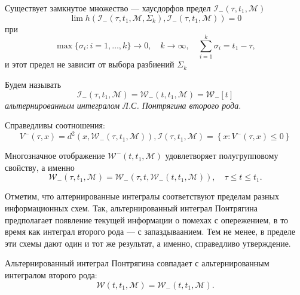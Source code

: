 \begin{lemma}
    Существует замкнутое множество --- хаусдорфов предел \( \mathcal{I}_-(\tau, t_1, \mathcal{M}) \)
    \[
        \lim h \left( \mathcal{I}_-(\tau, t_1, \mathcal{M}, \Sigma_k), \mathcal{I}_-(\tau, t_1,
         \mathcal{M}) \right) = 0    
    \]
    при
    \[
        \max\{\sigma_i : i = 1, \dots, k \} \to 0, \quad k \to \infty, \quad \sum_{i = 1}^k 
         \sigma_i = t_1 - \tau,
    \]
    и этот предел не зависит от выбора разбиений \( \Sigma_k \)
\end{lemma}

Будем называть
\[ 
    \mathcal{I}_-(\tau, t_1, \mathcal{M}) = \mathcal{W}_-(t, t_1, \mathcal{M}) = \mathcal{W}_-[t]
\]
\emph{альтернированным интегралом Л.С. Понтрягина второго рода}.

\begin{lemma}
    Справедливы соотношения:
    \[
        V^-(\tau, x) = d^2(x, \mathcal{W}_-(\tau, t_1, \mathcal{M})),
        \mathcal{I}(\tau, t_1, \mathcal{M}) = \left\{ x : V^-(\tau, x) \le 0 \right\} 
    \]
\end{lemma}

\begin{lemma}
    Многозначное отображение \( \mathcal{W}^-(t, t_1, \mathcal{M}) \) удовлетворяет полугрупповому
     свойству, а именно
    \[
        \mathcal{W}_-(\tau, t_1, \mathcal{M}) = \mathcal{W}_-(\tau, t, \mathcal{W}_-(t, t_1,
         \mathcal{M})), \quad \tau \le t \le t_1.
    \]

\end{lemma}

Отметим, что алтернированные интегралы соответствуют пределам разных информационных схем. Так,
 альтернированный интеграл Понтрягина предполагает появление текущей информации о помехах с опережением,
 в то время как интеграл второго рода --- с запаздываанием. Тем не менее, в пределе эти схемы дают
 один и тот же результат, а именно, справедливо утверждение.

\begin{theorem}
    Альтернированный интеграл Понтрягина совпадает с альтернированным интегралом второго рода:
    \[
        \mathcal{W}(t, t_1, \mathcal{M}) = \mathcal{W}_-(t, t_1, \mathcal{M}).
    \]
\end{theorem}

